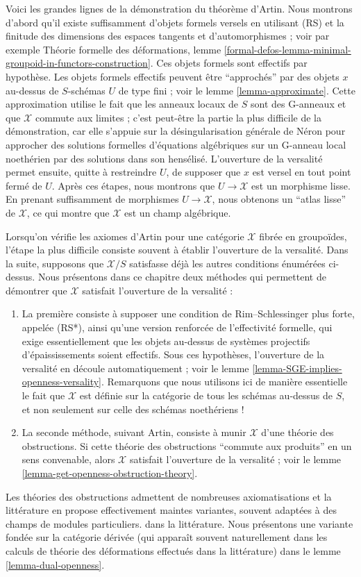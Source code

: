 \medskip\noindent
Voici les grandes lignes de la démonstration du théorème d'Artin.
Nous montrons d'abord qu'il existe suffisamment d'objets formels versels
en utilisant (RS) et la finitude des dimensions des espaces tangents et d'automorphismes ; voir
par exemple Théorie formelle des déformations, lemme
\ref{formal-defos-lemma-minimal-groupoid-in-functors-construction}.
Ces objets formels sont effectifs par hypothèse.
Les objets formels effectifs peuvent être ``approchés'' par des objets $x$ au-dessus de
$S$-schémas $U$ de type fini ; voir le lemme \ref{lemma-approximate}.
Cette approximation utilise le fait que les anneaux locaux de $S$ sont des G-anneaux et
que $\mathcal{X}$ commute aux limites ; c'est peut-être la partie la plus difficile
de la démonstration, car elle s'appuie sur la désingularisation générale de N\'eron pour
approcher des solutions formelles d'équations algébriques sur un G-anneau local
noethérien par des solutions dans son hensélisé.
L'ouverture de la versalité permet ensuite, quitte à restreindre $U$,
de supposer que $x$ est versel en tout point fermé de $U$.
Après ces étapes, nous montrons que $U \to \mathcal{X}$
est un morphisme lisse. En prenant suffisamment de morphismes $U \to \mathcal{X}$,
nous obtenons un ``atlas lisse'' de $\mathcal{X}$, ce qui montre
que $\mathcal{X}$ est un champ algébrique.

\medskip\noindent
Lorsqu'on vérifie les axiomes d'Artin pour une catégorie $\mathcal{X}$ fibrée
en groupoïdes, l'étape la plus difficile consiste souvent à établir l'ouverture
de la versalité. Dans la suite, supposons que $\mathcal{X}/S$
satisfasse déjà les autres conditions énumérées ci-dessus.
Nous présentons dans ce chapitre deux méthodes qui permettent
de démontrer que $\mathcal{X}$ satisfait l'ouverture de la versalité :
\begin{enumerate}
\item La première consiste à supposer une condition de Rim--Schlessinger
plus forte, appelée (RS*), ainsi qu'une version renforcée de
l'effectivité formelle, qui exige essentiellement que les objets au-dessus de
systèmes projectifs d'épaississements soient effectifs. Sous
ces hypothèses, l'ouverture de la versalité en découle automatiquement ;
voir le lemme \ref{lemma-SGE-implies-openness-versality}.
Remarquons que nous utilisons ici de manière essentielle le fait
que $\mathcal{X}$ est définie sur la catégorie de tous les schémas
au-dessus de $S$, et non seulement sur celle des schémas noethériens !
\item La seconde méthode, suivant Artin, consiste à munir $\mathcal{X}$
d'une théorie des obstructions. Si cette théorie des obstructions
``commute aux produits'' en un sens convenable, alors
$\mathcal{X}$ satisfait l'ouverture de la versalité ; voir le
lemme \ref{lemma-get-openness-obstruction-theory}.
\end{enumerate}
Les théories des obstructions admettent de nombreuses axiomatisations
et la littérature en propose effectivement maintes variantes, souvent adaptées à des champs de modules particuliers.
dans la littérature. Nous présentons une variante fondée sur la catégorie dérivée
(qui apparaît souvent naturellement dans les calculs de théorie des déformations
effectués dans la littérature) dans le lemme \ref{lemma-dual-openness}.

